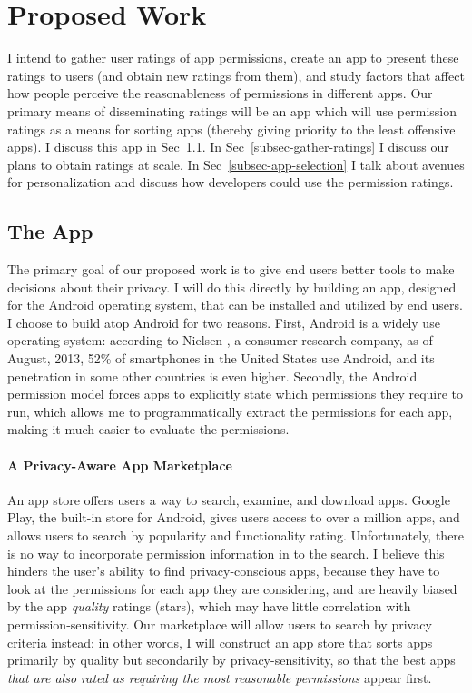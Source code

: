 \documentclass[11pt]{article}
\begin{document}
\section{Proposed Work}

I intend to gather user ratings of app permissions, create 
an app to present these ratings
to users (and obtain new ratings from them), and study factors that
affect how people perceive the reasonableness of permissions in
different apps. Our primary means of disseminating ratings will be
an app which will use permission ratings as a means for sorting
apps (thereby giving priority to the least offensive apps). 
I discuss this app in Sec~\ref{subsec-the-apps}. 
In Sec~\ref{subsec-gather-ratings} 
I discuss our plans to obtain ratings at scale. In
Sec~\ref{subsec-app-selection} I talk about avenues for personalization 
and discuss how developers could use the permission ratings.

\subsection{The App}
\label{subsec-the-apps}

The primary goal of our proposed work is to give end users better tools to make decisions
about their privacy. I will do this directly by building an app, designed for the Android 
operating system, that can be installed 
and utilized by end users. I choose to build atop Android for two reasons.
First, Android is a widely use operating system: according to Nielsen 
\cite{android-market-share}, a consumer research 
company, as of August, 2013, 52\% of smartphones in the United
States use Android, and its penetration in some other countries is
even higher.
Secondly, the Android permission model forces apps to explicitly state which permissions
they require to run, which allows me to programmatically extract the permissions for each 
app, making it much easier to evaluate the permissions. 

\paragraph{A Privacy-Aware App Marketplace}
\label{subsubsec-privacy-store}

An app store offers users a way to search, examine, and download
apps.  Google Play, the built-in store for Android, gives
users access to over a million apps, and allows users to search by
popularity and functionality rating. Unfortunately, there is no way to incorporate
permission information in to the search. I believe this hinders the
user's ability to find privacy-conscious apps, because they have to
look at the permissions for each app they are considering, and are
heavily biased by the app \emph{quality} ratings (stars), which may
have little correlation with permission-sensitivity. Our marketplace
will allow users to search by privacy criteria instead: in other
words, I will construct an app store that sorts apps primarily by
quality but secondarily by privacy-sensitivity, so that the best apps
\emph{that are also rated as requiring the most reasonable
  permissions} appear first.
\end{document}
